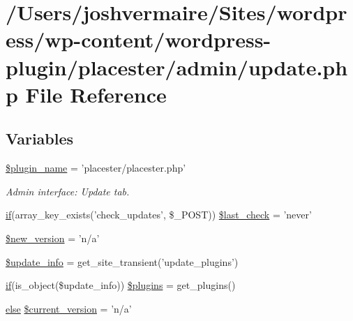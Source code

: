 \hypertarget{update_8php}{
\section{/Users/joshvermaire/Sites/wordpress/wp-\/content/wordpress-\/plugin/placester/admin/update.php File Reference}
\label{d9/da8/update_8php}
}
\subsection*{Variables}
\begin{DoxyCompactItemize}
\item 
\hyperlink{update_8php_aebacc51188e2a01d35a6a6fe9161d0ce}{\$plugin\_\-name} = 'placester/placester.php'
\begin{DoxyCompactList}\small\item\em Admin interface: Update tab. \end{DoxyCompactList}\item 
\hyperlink{listings__list__lone__divbased_8php_a0b49fff73af3a13232913ea65ca484d9}{if}(array\_\-key\_\-exists('check\_\-updates', \$\_\-POST)) \hyperlink{update_8php_a5d52e11696b2fb4a270cb646bc74fa60}{\$last\_\-check} = 'never'
\item 
\hyperlink{update_8php_a336d585259ff900944c84863ccf978b3}{\$new\_\-version} = 'n/a'
\item 
\hyperlink{update_8php_ae119c8eda43eaef6fbe36934db8fdbcb}{\$update\_\-info} = get\_\-site\_\-transient('update\_\-plugins')
\item 
\hyperlink{listings__list__lone__divbased_8php_a0b49fff73af3a13232913ea65ca484d9}{if}(is\_\-object(\$update\_\-info)) \hyperlink{update_8php_acc9acb4ba121a45f67dcbe11d7d24062}{\$plugins} = get\_\-plugins()
\item 
\hyperlink{listings__list__of__map_8php_a0544c3fe466e421738dae463968b70ba}{else} \hyperlink{update_8php_a20b5dc30a183aec32d6989083c19d135}{\$current\_\-version} = 'n/a'
\end{DoxyCompactItemize}



